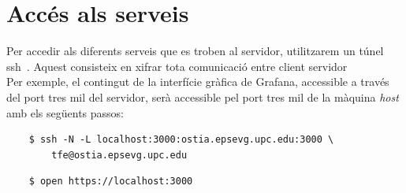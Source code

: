 \section*{Accés als serveis}\label{sec:server-access}

\noindent
Per accedir als diferents serveis que es troben al servidor, utilitzarem un túnel ssh~\cite{tunel-ssh}.
Aquest consisteix en xifrar tota comunicació entre client servidor \\

\noindent
Per exemple, el contingut de la interfície gràfica de Grafana, accessible a través del port tres mil del servidor,
serà accessible pel port tres mil de la màquina \textit{host} amb els següents passos:

\begin{verbatim}
    $ ssh -N -L localhost:3000:ostia.epsevg.upc.edu:3000 \
        tfe@ostia.epsevg.upc.edu
\end{verbatim}
\begin{verbatim}
    $ open https://localhost:3000
\end{verbatim}